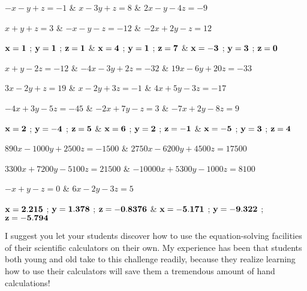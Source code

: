  \columns
\+ $-x - y + z = -1$  &
$x - 3y + z = 8$  &
$2x - y - 4z = -9$ \cr

 \columns
\+ $x + y + z = 3$  &
$-x - y - z = -12 $  &
$-2x + 2y - z = 12$ \cr

 \columns
\+ ${\bf x = 1}$ ; ${\bf y = 1}$ ; ${\bf z = 1}$ &
${\bf x = 4}$ ; ${\bf y = 1}$ ; ${\bf z = 7}$ &
${\bf x = -3}$ ; ${\bf y = 3}$ ; ${\bf z = 0}$ \cr

\vskip 20pt

 \columns
\+ $x + y - 2z = -12$  &
$-4x - 3y + 2z = -32$  &
$19x - 6y + 20z = -33$ \cr

 \columns
\+ $3x - 2y + z = 19$  &
$x - 2y + 3z = -1$  &
$4x + 5y - 3z = -17$ \cr

 \columns
\+ $-4x + 3y - 5z = -45$  &
$-2x + 7y - z = 3$  &
$-7x + 2y - 8z = 9$ \cr

 \columns
\+ ${\bf x = 2}$ ; ${\bf y = -4}$ ; ${\bf z = 5}$ &
${\bf x = 6}$ ; ${\bf y = 2}$ ; ${\bf z = -1}$ &
${\bf x = -5}$ ; ${\bf y = 3}$ ; ${\bf z = 4}$ \cr

\vskip 20pt

 \columns
\+ $890x - 1000y + 2500z = -1500$  &
$2750x - 6200y + 4500z = 17500$ \cr

 \columns
\+ $3300x + 7200y - 5100z = 21500$  &
$-10000x + 5300y - 1000z = 8100$ \cr

 \columns
\+ $-x + y - z = 0$  &
$6x - 2y - 3z = 5$ \cr

 \columns
\+ ${\bf x = 2.215}$ ; ${\bf y = 1.378}$ ; ${\bf z = -0.8376}$ &
${\bf x = -5.171}$ ; ${\bf y = -9.322}$ ; ${\bf z = -5.794}$ \cr

\vskip 10pt







I suggest you let your students discover how to use the equation-solving facilities of their scientific calculators on their own.  My experience has been that students both young and old take to this challenge readily, because they realize learning how to use their calculators will save them a tremendous amount of hand calculations!




